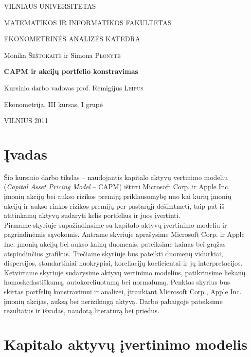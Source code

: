 \documentclass[12pt, a14paper, lithuanian]{article}
\begin{document}
\begin{titlepage}
\centerline{ \large VILNIAUS UNIVERSITETAS}
\bigskip
\centerline{\large MATEMATIKOS IR INFORMATIKOS FAKULTETAS}
\smallskip

\centerline{\large  EKONOMETRINĖS ANALIZĖS KATEDRA}
\vskip 200pt
\centerline{ \large Monika \textsc{Šeštokaitė} ir \large Simona \textsc{Plonytė}}
\vskip 50pt
\centerline{\bf \Large CAPM ir akcijų portfelio konstravimas}
\bigskip
\vskip 25pt
\centerline{Kursinio darbo vadovas prof. \large {Remigijus} \textsc{Leipus}}
\vskip 25pt
\hfill Ekonometrija, III kursas, I grupė
\vskip 100pt
\centerline{\large VILNIUS 2011}
\end{titlepage}



\tableofcontents
\newpage




\newcommand{\sectionnonum}[1]{%
    \section*{#1}%
    \addcontentsline{toc}{section}{#1}%
}
\sectionnonum{Įvadas}

Šio kursinio darbo tikslas -- naudojantis kapitalo aktyvų vertinimo modeliu (\textit{Capital Asset Pricing Model} -- CAPM) ištirti Microsoft Corp. ir Apple Inc. įmonių akcijų bei aukso rizikos premijų priklausomybę nuo kai kurių įmonių akcijų ir aukso rinkos rizikos premijų per pastarąjį dešimtmetį, taip pat iš atitinkamų aktyvų sudaryti kelis portfelius ir juos įvertinti. \\

Pirmame skyriuje supažindinsime su kapitalo aktyvų įvertinimo modeliu ir pagrindinėmis sąvokomis. Antrame skyriuje aprašysime Microsoft Corp. ir Apple Inc. įmonių akcijų bei aukso kainų duomenis, pateiksime kainas bei grąžas atspindinčius grafikus. Trečiame skyriuje bus pateikti duomenų vidurkiai, dispersijos, standartiniai nuokrypiai, koreliacijų koeficientai ir jų interpretacijos. Ketvirtame skyriuje sudarysime aktyvų vertinimo modelius, patikrinsime liekanų homoskedastiškumą, autokoreliuotumą bei normalumą. Penktas skyrius bus skirtas portfelių konstravimui ir analizei, įtraukiant Microsoft Corp., Apple Inc. įmonių akcijas, auksą bei nerizikingą aktyvą. Darbo pabaigoje pateiksime rezultatus ir išvadas, naudotą literatūrą bei priedus.

\newpage

\section{Kapitalo aktyvų įvertinimo modelis}
\end{document}
